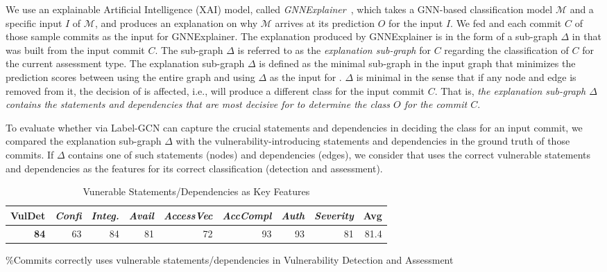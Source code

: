 We use an explainable Artificial Intelligence (XAI) model,
called {\em GNNExplainer}~\cite{GNNExplainer}, which takes a GNN-based
classification model $\mathcal{M}$ and a specific input $I$ of
$\mathcal{M}$, and produces an explanation on why $\mathcal{M}$
arrives at its prediction $O$ for the input $I$.
%
We fed {\tool} and each commit $C$ of those sample commits as the
input for GNNExplainer. The explanation produced by GNNExplainer is in
the form of a sub-graph $\Delta$ in {\mvpdg} that was built from the
input commit $C$. The sub-graph $\Delta$ is referred to as the {\em
explanation sub-graph} for $C$ regarding the classification of $C$ for
the current assessment type. The explanation sub-graph $\Delta$ is
defined as the minimal sub-graph in the input graph {\mvpdg} that
minimizes the prediction scores between using the entire graph
{\mvpdg} and using $\Delta$ as the input for {\tool}. $\Delta$ is
minimal in the sense that if any node and edge is removed from it, the
decision of {\tool} is affected, i.e., {\tool} will produce a
different class for the input commit $C$. That is, {\em the
explanation sub-graph $\Delta$ contains the statements and
dependencies that are most decisive for {\tool} to determine the class
$O$ for the commit $C$}.

To evaluate whether {\tool} via Label-GCN can capture the crucial
statements and dependencies in deciding the class for an input commit,
we compared the explanation sub-graph $\Delta$ with the
vulnerability-introducing statements and dependencies in the ground
truth of those commits. If $\Delta$ contains one of such statements
(nodes) and dependencies (edges), we consider that {\tool} uses the
correct vulnerable statements and dependencies as the features for its
correct classification (detection and assessment).


\begin{table}[t]
\caption{Vunerable Statements/Dependencies as Key Features}
	\vspace{-7pt}
	\tabcolsep 2.1pt
\small
	\begin{center}
\begin{tabular}{|r||r|r|r|r|r|r|r||r|}
  \hline
    {\bf VulDet} & {\em Confi} & {\em Integ.} & {\em Avail} & {\em AccessVec} & {\em AccCompl} & {\em Auth} & {\em Severity} & {\bf Avg} \\
  \hline
  {\bf 84} & 63 & 84 & 81 & 72 & 93 & 93 & 81 & 81.4 \\
  \hline
\end{tabular}
\label{gnn}
\%Commits {\tool} correctly uses vulnerable statements/dependencies in Vulnerability Detection and Assessment
\end{center}
\vspace{-6pt}
\end{table}

